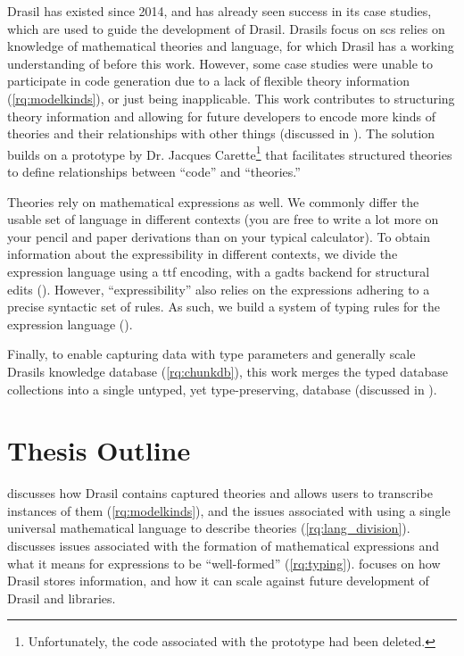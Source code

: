 

Drasil has existed since 2014, and has already seen success in its case studies,
which are used to guide the development of Drasil. Drasils focus on \acs{scs}
relies on knowledge of mathematical theories and language, for which Drasil has
a working understanding of before this work. However, some case studies were
unable to participate in code generation due to a lack of flexible theory
information (\ref{rq:modelkinds}), or just being inapplicable. This work
contributes to structuring theory information and allowing for future developers
to encode more kinds of theories and their relationships with other things
(discussed in ). The solution builds on a prototype by Dr.
Jacques Carette\footnote{Unfortunately, the code associated with the prototype
      had been deleted.} that facilitates structured theories to define relationships
between ``code'' and ``theories.''


Theories rely on mathematical expressions as well. We commonly differ the usable
set of language in different contexts (you are free to write a lot more on your
pencil and paper derivations than on your typical calculator). To obtain
information about the expressibility in different contexts, we divide the
expression language using a \acs{ttf} \cite{Carette2009} encoding, with a
\acsp{gadt} backend for structural edits (). However,
``expressibility'' also relies on the expressions adhering to a precise
syntactic set of rules. As such, we build a system of typing rules for the
expression language ().

Finally, to enable capturing data with type parameters and generally scale
Drasils knowledge database (\ref{rq:chunkdb}), this work merges the typed
database collections into a single untyped, yet type-preserving, database
(discussed in ).

\section{Thesis Outline}
\label{sec:intro:outline}

 discusses how Drasil contains captured theories and
allows users to transcribe instances of them (\ref{rq:modelkinds}), and the
issues associated with using a single universal mathematical language to
describe theories (\ref{rq:lang_division}).  discusses
issues associated with the formation of mathematical expressions and what it
means for expressions to be ``well-formed'' (\ref{rq:typing}).
 focuses on how Drasil stores information, and how it
can scale against future development of Drasil and libraries.






